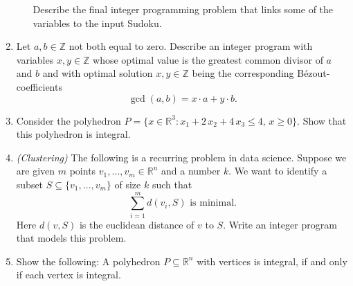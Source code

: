 \documentclass[11pt]{article}
\newcommand{\setR}{\mathbb{R}}
\renewcommand{\leq}{\leqslant}
\renewcommand{\geq}{\geqslant}
\begin{document}
\begin{enumerate}[1)]
\begin{enumerate}[a)]
    Describe the final integer programming problem that links some of the variables to the input Sudoku. 
    
  \end{enumerate}

\item Let $a, b ∈ℤ$ not both equal to zero. Describe an integer program with variables $x,y ∈ℤ$ whose optimal value is the greatest common divisor of $a$ and $b$ and with optimal solution $x,y ∈ℤ$ being the corresponding  Bézout-coefficients
  \begin{displaymath}
    \gcd(a,b) = x⋅a + y⋅b. 
  \end{displaymath}
  
 \item Consider the polyhedron $P = \{ x \in \setR^3 \colon x_1 + 2\,x_2 + 4\,
  x_3 \leq 4, \, x\geq0\}$. Show that this polyhedron is
  integral. 

\item \emph{(Clustering)} The following is a recurring problem in data science. Suppose we are given $m$ points $v_1,\dots,v_m ∈ ℝ^n$ and a number $k$. We want to identify a subset $S ⊆ \{v_1,\dots,v_m\}$ of size $k$ such that
  \begin{displaymath}
    ∑_{i=1}^m d(v_i, S)  \text{ is minimal.} 
  \end{displaymath}
  Here $d (v,S)$ is the euclidean distance of $v$ to $S$. 
  Write an integer program that models this problem.

  \item Show the following: A polyhedron $P \subseteq\setR^n$ with vertices is
  integral, if and only if each vertex is integral. \label{i:item:3}
  
  
\end{enumerate}



  
\end{document}
